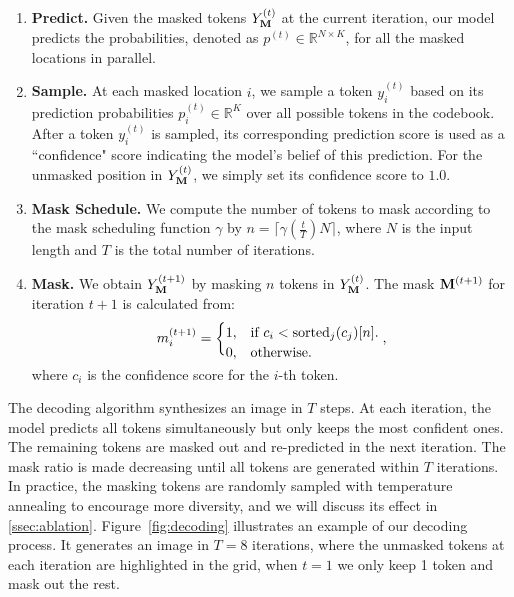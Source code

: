  \vspace{-2mm}
 \begin{enumerate}
     \item \textbf{Predict.}  Given the masked tokens $Y_{\mathbf{M}}^{(t)}$ at the current iteration, our model predicts the probabilities, denoted as $p^{(t)} \in \mathbb{R}^{N \times K}$, for all the masked locations in parallel.  \\ \vspace{-5mm}
     \item \textbf{Sample.} At each masked location $i$, we sample a token $y_i^{(t)}$ based on its prediction probabilities $p_i^{(t)} \in \mathbb{R}^K$ over all possible tokens in the codebook. After a token $y_i^{(t)}$ is sampled, its corresponding prediction score is used as a ``confidence" score indicating the model's belief of this prediction. 
     For the unmasked position in $Y_{\mathbf{M}}^{(t)}$, we simply set its confidence score to $1.0$. \\ \vspace{-5mm}
    \item \textbf{Mask Schedule.} We compute the number of tokens to mask according to the mask scheduling function $\gamma$ by $n = \lceil \gamma(\frac{t}{T}) N \rceil$, where $N$ is the input length and $T$ is the total number of iterations.
    \item \textbf{Mask.} We obtain $Y_{\mathbf{M}}^{(t+1)}$ by masking $n$ tokens in $Y_{\mathbf{M}}^{(t)}$. The mask ${\mathbf{M}}^{(t+1)}$ for iteration $t+1$ is calculated from:\vspace{-2mm}
        \begin{equation*}
         m_{i}^{(t+1)} = 
        \begin{cases}
            1,  & \text{if $c_i < {\text{sorted}}_j(c_j)[n]$.}\\
            0,  & \text{otherwise.}\vspace{-2mm}
        \end{cases},
        \end{equation*}
    where $c_i$ is the confidence score for the $i$-th token.

 \end{enumerate}

The decoding algorithm synthesizes an image in $T$ steps. At each iteration, the model predicts all tokens simultaneously but only keeps the most confident ones. The remaining tokens are masked out and re-predicted in the next iteration. The mask ratio is made decreasing until all tokens are generated within $T$ iterations. In practice, the masking tokens are randomly sampled with temperature annealing to encourage more diversity, and we will discuss its effect in \ref{ssec:ablation}. Figure~\ref{fig:decoding} illustrates an example of our decoding process. It generates an image in $T=8$ iterations, where the unmasked tokens at each iteration are highlighted in the grid, \eg when $t=1$ we only keep 1 token and mask out the rest.

